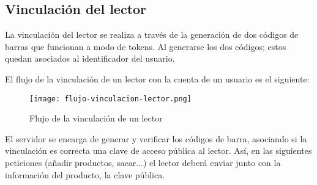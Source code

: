 \subsection{Vinculación del lector}

La vinculación del lector se realiza a través de la generación de dos códigos de barras que funcionan a modo de tokens. Al generarse los dos códigos; estos quedan asociados al identificador del usuario.

El flujo de la vinculación de un lector con la cuenta de un usuario es el siguiente:

\begin{figure}[H]
    \centering
    \texttt{[image: flujo-vinculacion-lector.png]}
    \caption{Flujo de la vinculación de un lector}\label{fig:flujo-vinculacion-lector}
\end{figure}

El servidor se encarga de generar y verificar los códigos de barra, asociando si la vinculación es correcta una clave de acceso pública al lector. Así, en las siguientes peticiones (añadir productos, sacar...) el lector deberá enviar junto con la información del producto, la clave pública.